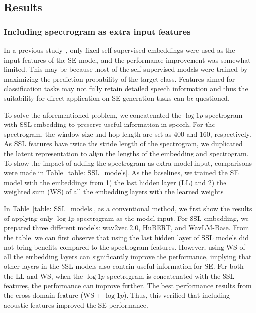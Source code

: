 \documentclass[a4paper]{article}
\begin{document}
\subsection{Results}
\subsubsection{Including spectrogram as extra input features}
In a previous study~\cite{ZiliSSL}, only fixed self-supervised embeddings were used as the input features of the SE model, and the performance improvement was somewhat limited. This may be because most of the self-supervised models were trained by maximizing the prediction probability of the target class. Features aimed for classification tasks may not fully retain detailed speech information and thus the suitability for direct application on SE generation tasks can be questioned.

To solve the aforementioned problem, we concatenated the $\log 1p$ spectrogram with SSL embedding to preserve useful information in speech. For the spectrogram, the window size and hop length are set as 400 and 160, respectively. As SSL features have twice the stride length of the spectrogram, we duplicated the latent representation to align the lengths of the embedding and spectrogram. To show the impact of adding the spectrogram as extra model input, comparisons were made in Table~\ref{table: SSL_models}. As the baselines, we trained the SE model with the embeddings from 1) the last hidden layer (LL) and 2) the weighted sum (WS) of all the embedding layers with the learned weights. 

In Table~\ref{table: SSL_models}, as a conventional method, we first show the results of applying only $\log 1p$ spectrogram as the model input. For SSL embedding, we prepared three different models: wav2vec 2.0, HuBERT, and WavLM-Base. From the table, we can first observe that using the last hidden layer of SSL models did not bring benefits compared to the spectrogram features. However, using WS of all the embedding layers can significantly improve the performance, implying that other layers in the SSL models also contain useful information for SE. For both the LL and WS, when the $\log 1p$ spectrogram is concatenated with the SSL features, the performance can improve further. The best performance results from the cross-domain feature (WS + $\log 1p$). Thus, this verified that including acoustic features improved the SE performance.
\end{document}
